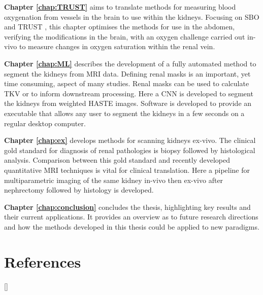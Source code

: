 \textbf{Chapter \ref{chap:TRUST}} aims to translate methods for measuring blood oxygenation from vessels in the brain to use within the kidneys. Focusing on \ac{SBO} \cite{jain_mri_2010} and \ac{TRUST} \cite{lu_quantitative_2008}, this chapter optimises the methods for use in the abdomen, verifying the modifications in the brain, with an oxygen challenge carried out in-vivo to measure changes in oxygen saturation within the renal vein.

\textbf{Chapter \ref{chap:ML}} describes the development of a fully automated method to segment the kidneys from \ac{MRI} data. Defining renal masks is an important, yet time consuming, aspect of many studies. Renal masks can be used to calculate \ac{TKV} or to inform downstream processing. Here a \ac{CNN} is developed to segment the kidneys from \ttwo weighted \ac{HASTE} images. Software is developed to provide an executable that allows any user to segment the kidneys in a few seconds on a regular desktop computer.

\textbf{Chapter \ref{chap:ex}} develops methods for scanning kidneys ex-vivo. The clinical gold standard for diagnosis of renal pathologies is biopsy followed by histological analysis. Comparison between this gold standard and recently developed quantitative \ac{MRI} techniques is vital for clinical translation. Here a pipeline for multiparametric imaging of the same kidney in-vivo then ex-vivo after nephrectomy followed by histology is developed.

\textbf{Chapter \ref{chap:conclusion}} concludes the thesis, highlighting key results and their current applications. It provides an overview as to future research directions and how the methods developed in this thesis could be applied to new paradigms.

\newpage
\section{References}
[\refname]{}
\printbibliography